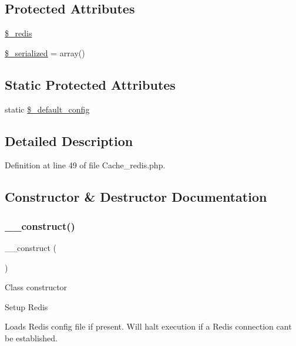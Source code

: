 \subsection*{Protected Attributes}
\begin{DoxyCompactItemize}
\item 
\mbox{\hyperlink{class_c_i___cache__redis_a36de60a8fcbe3efac91a87577d0728de}{\$\+\_\+redis}}
\item 
\mbox{\hyperlink{class_c_i___cache__redis_a138ded30ad61d04611681cdf7060a6cf}{\$\+\_\+serialized}} = array()
\end{DoxyCompactItemize}
\subsection*{Static Protected Attributes}
\begin{DoxyCompactItemize}
\item 
static \mbox{\hyperlink{class_c_i___cache__redis_afbad69596f851c659fd07255c321fb97}{\$\+\_\+default\+\_\+config}}
\end{DoxyCompactItemize}


\subsection{Detailed Description}


Definition at line 49 of file Cache\+\_\+redis.\+php.



\subsection{Constructor \& Destructor Documentation}
\mbox{\label{class_c_i___cache__redis_a095c5d389db211932136b53f25f39685}} 
\subsubsection{\texorpdfstring{\_\_construct()}{\_\_construct()}}
{\footnotesize\ttfamily \+\_\+\+\_\+construct (\begin{DoxyParamCaption}{ }\end{DoxyParamCaption})}

Class constructor

Setup Redis

Loads Redis config file if present. Will halt execution if a Redis connection can\textquotesingle{}t be established.

